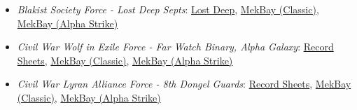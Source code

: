 \begin{itemize}
\item \emph{Blakist Society Force - Lost Deep Septs}: \href{https://raw.githubusercontent.com/Eudicods/outworlds-wastes/rules-pdf/society.pdf}{Lost Deep}, \href{https://mekbay.com/?units=Outworlds%20Wastes~BMRiflemanIIC_2,BMGriffinIIC_4:5:5,BMClintIIC:5:5,BMLocustIIC:5:5,BMLocustIIC:5:5,BMJennerIIC:6:5,PMBoggartUltraheavyProtoMech,PMRoc,PMMinotaur_Z,PMHobgoblinUltraheavyProtoMech,PMBasiliskProtoMechQuad,BAGnomeBattleArmor_Sqd3,BAGnomeBattleArmor_Sqd3,BAElementalBattleArmor_LaserSqd3,BAElementalBattleArmor_LaserSqd3,BAElementalBattleArmor_FlamerSqd3,BAElementalBattleArmor_FlamerSqd3&name=Lost%20Deep%20Septs&gs=cbt}{MekBay (Classic)}, \href{https://mekbay.com/?units=Outworlds%20Wastes~BMRiflemanIIC_2,BMGriffinIIC_4:5:5,BMClintIIC:5:5,BMLocustIIC:5:5,BMLocustIIC:5:5,BMJennerIIC:6:5,PMBoggartUltraheavyProtoMech,PMRoc,PMMinotaur_Z,PMHobgoblinUltraheavyProtoMech,PMBasiliskProtoMechQuad,BAGnomeBattleArmor_Sqd3,BAGnomeBattleArmor_Sqd3,BAElementalBattleArmor_LaserSqd3,BAElementalBattleArmor_LaserSqd3,BAElementalBattleArmor_FlamerSqd3,BAElementalBattleArmor_FlamerSqd3&name=Lost%20Deep%20Septs&gs=as}{MekBay (Alpha Strike)}

\item \emph{Civil War Wolf in Exile Force - Far Watch Binary, Alpha Galaxy}: \href{https://raw.githubusercontent.com/Eudicods/outworlds-wastes/rules-pdf/wolf-in-exile.pdf}{Record Sheets}, \href{https://mekbay.com/?units=Outworlds%20Wastes~BMMasakari_B,BMPouncer_E,BMBlackHawk_D,BMDasher_A,AFGotha_GTHA500b:5:5,AFBashkir_A,BAElementalBattleArmor_LaserSqd5,BAElementalBattleArmor_LaserSqd5,BAElementalBattleArmor_MGSqd5,BAElementalBattleArmor_MGSqd5&name=Far%20Watch%20Binary,%20Alpha%20Galaxy&gs=cbt}{MekBay (Classic)}, \href{https://mekbay.com/?units=Outworlds%20Wastes~BMMasakari_B,BMPouncer_E,BMBlackHawk_D,BMDasher_A,AFGotha_GTHA500b:5:5,AFBashkir_A,BAElementalBattleArmor_LaserSqd5,BAElementalBattleArmor_LaserSqd5,BAElementalBattleArmor_MGSqd5,BAElementalBattleArmor_MGSqd5&name=Far%20Watch%20Binary,%20Alpha%20Galaxy&gs=as}{MekBay (Alpha Strike)}

\item \emph{Civil War Lyran Alliance Force - 8th Dongel Guards}: \href{https://raw.githubusercontent.com/Eudicods/outworlds-wastes/rules-pdf/lyran-alliance.pdf}{Record Sheets}, \href{https://mekbay.com/?units=Outworlds%20Wastes~BMAtlas_C,BMArcher_ARC6S,BMBlackjack_BJ2,BMLocust_C,CVSturmFeurHeavyTank_HeavyGauss,CVHunterLightSupportTank_ERLL,CVKarnovURTransport_BA,CVKestrelVTOL_ML,BAFenrirBattleArmor_MPLSqd4,BARottweilerBattleArmor_Sqd4,BAISStandardBattleArmor_LaserSqd4,BAISStandardBattleArmor_LaserSqd4&name=8th%20Dongel%20Guards&gs=cbt}{MekBay (Classic)}, \href{https://mekbay.com/?units=Outworlds%20Wastes~BMAtlas_C,BMArcher_ARC6S,BMBlackjack_BJ2,BMLocust_C,CVSturmFeurHeavyTank_HeavyGauss,CVHunterLightSupportTank_ERLL,CVKarnovURTransport_BA,CVKestrelVTOL_ML,BAFenrirBattleArmor_MPLSqd4,BARottweilerBattleArmor_Sqd4,BAISStandardBattleArmor_LaserSqd4,BAISStandardBattleArmor_LaserSqd4&name=8th%20Dongel%20Guards&gs=as}{MekBay (Alpha Strike)}


\end{itemize}
